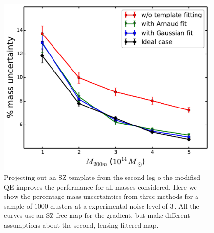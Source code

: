  \begin{figure}[thb]
\includegraphics[width=\linewidth, keepaspectratio]{figs/uncen_vs_mass.pdf}
 \caption{
 Projecting out an SZ template from the second leg o the modified QE improves the performance for all masses considered. 
 Here we show the percentage mass uncertainties from three methods for a sample of 1000 clusters at a experimental noise level of 3\,\ukarcmin{}.
 All the curves use an SZ-free map for the gradient, but make different assumptions about the second, lensing filtered map. 
\label{fig:template_fitting}}
\end{figure}

